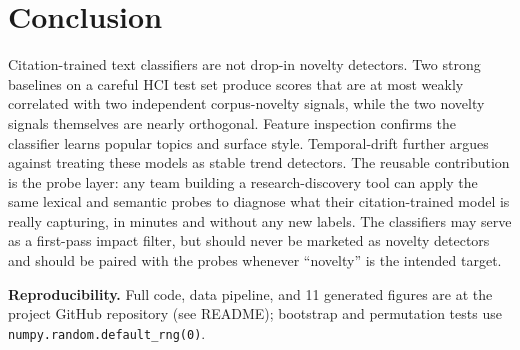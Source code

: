 \documentclass[conference]{IEEEtran}
\begin{document}
\section{Conclusion}
Citation-trained text classifiers are not drop-in novelty detectors. Two strong baselines on a careful HCI test set produce scores that are at most weakly correlated with two independent corpus-novelty signals, while the two novelty signals themselves are nearly orthogonal. Feature inspection confirms the classifier learns popular topics and surface style. Temporal-drift further argues against treating these models as stable trend detectors. The reusable contribution is the probe layer: any team building a research-discovery tool can apply the same lexical and semantic probes to diagnose what their citation-trained model is really capturing, in minutes and without any new labels. The classifiers may serve as a first-pass impact filter, but should never be marketed as novelty detectors and should be paired with the probes whenever ``novelty'' is the intended target.

\textbf{Reproducibility.} Full code, data pipeline, and 11 generated figures are at the project GitHub repository (see README); bootstrap and permutation tests use \texttt{numpy.random.default\_rng(0)}.
\end{document}
